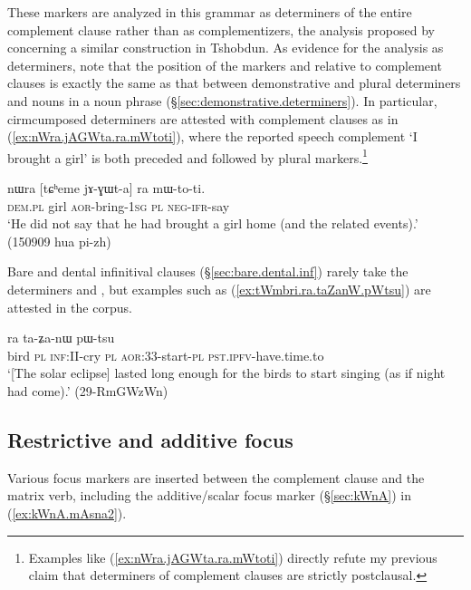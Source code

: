 These markers are analyzed in this grammar as determiners of the entire complement clause rather than as complementizers, the analysis proposed by \citet[481]{sun12complementation} concerning a similar construction in Tshobdun. As evidence for the analysis as determiners, note that the position of the markers  and  relative to complement clauses  is exactly the same as that between demonstrative and plural determiners and nouns in a noun phrase (§\ref{sec:demonstrative.determiners}). In particular, cirmcumposed determiners are attested with complement clauses as in (\ref{ex:nWra.jAGWta.ra.mWtoti}), where the reported speech complement  `I brought a girl' is both preceded and followed by plural markers.\footnote{Examples like (\ref{ex:nWra.jAGWta.ra.mWtoti}) directly refute my previous claim \citep[258]{jacques16complementation} that determiners of complement clauses are strictly postclausal. }

\begin{exe}
\ex \label{ex:nWra.jAGWta.ra.mWtoti}
\gll nɯra [tɕʰeme jɤ-ɣɯt-a] ra mɯ-to-ti. \\
\textsc{dem}.\textsc{pl} girl \textsc{aor}-bring-\textsc{1sg} \textsc{pl} \textsc{neg}-\textsc{ifr}-say \\
\glt  `He did not say that he had brought a girl home (and the related events).'  (150909 hua pi-zh)
\end{exe}
 
Bare and dental infinitival clauses (§\ref{sec:bare.dental.inf}) rarely take the determiners  and , but examples such as (\ref{ex:tWmbri.ra.taZanW.pWtsu}) are attested in the corpus.

\begin{exe}
\ex \label{ex:tWmbri.ra.taZanW.pWtsu}
 ra ta-ʑa-nɯ pɯ-tsu \\
bird \textsc{pl} \textsc{inf}:II-cry \textsc{pl} \textsc{aor}:3\fl{}3-start-\textsc{pl} \textsc{pst}.\textsc{ipfv}-have.time.to \\
\glt `[The solar eclipse] lasted long enough for the birds to start singing (as if night had come).' (29-RmGWzWn)
\end{exe}
 
 
\subsection{Restrictive and additive focus} \label{sec:complement.restriction}
 
Various focus markers are inserted between the complement clause and the matrix verb, including the additive/scalar focus marker  (§\ref{sec:kWnA}) in (\ref{ex:kWnA.mAsna2}).

